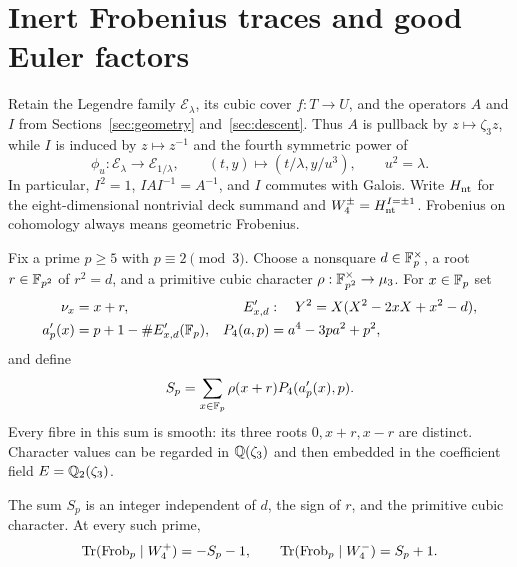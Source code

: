 \section{Inert Frobenius traces and good Euler factors}\label{sec:inert}

Retain the Legendre family $\mathcal E_\lambda$, its cubic cover
$f:T\to U$, and the operators $A$ and $I$ from
Sections~\ref{sec:geometry} and~\ref{sec:descent}.
Thus $A$ is pullback by $z\mapsto\zeta_3z$, while $I$ is induced by
$z\mapsto z^{-1}$ and the fourth symmetric power of
\[
 \phi_u:\mathcal E_\lambda\longrightarrow\mathcal E_{1/\lambda},
 \qquad(t,y)\longmapsto(t/\lambda,y/u^3),\qquad u^2=\lambda.
\]
In particular, $I^2=1$, $IAI^{-1}=A^{-1}$, and $I$ commutes with
Galois. Write $H_{\mathrm{nt}}$ for the eight-dimensional nontrivial deck
summand and $W_4^\pm=H_{\mathrm{nt}}^{I=\pm1}$. Frobenius on cohomology
always means geometric Frobenius.

Fix a prime $p\geq5$ with $p\equiv2\pmod3$. Choose a nonsquare
$d\in\mathbb F_p^\times$, a root $r\in\mathbb F_{p^2}$ of $r^2=d$, and a
primitive cubic character $\rho:\mathbb F_{p^2}^\times\to\mu_3$.
For $x\in\mathbb F_p$ set
\begin{align*}
 \nu_x&=x+r,&
 E'_{x,d}&:\quad Y^2=X(X^2-2xX+x^2-d),\\
 a'_p(x)&=p+1-\#E'_{x,d}(\mathbb F_p),&
 P_4(a,p)&=a^4-3pa^2+p^2,
\end{align*}
and define
\begin{equation}\label{eq:inert-sum}
 S_p=\sum_{x\in\mathbb F_p}\rho(x+r)P_4(a'_p(x),p).
\end{equation}
Every fibre in this sum is smooth: its three roots $0,x+r,x-r$
are distinct. Character values can be regarded in $\mathbb Q(\zeta_3)$
and then embedded in the coefficient field $E=\mathbb Q_2(\zeta_3)$.

\begin{theorem}\label{thm:inert-trace}
The sum $S_p$ is an integer independent of $d$, the sign of $r$,
and the primitive cubic character. At every such prime,
\begin{equation}\label{eq:inert-traces}
 \operatorname{Tr}(\operatorname{Frob}_p\mid W_4^+)=-S_p-1,
 \qquad
 \operatorname{Tr}(\operatorname{Frob}_p\mid W_4^-)=S_p+1.
\end{equation}
\end{theorem}

